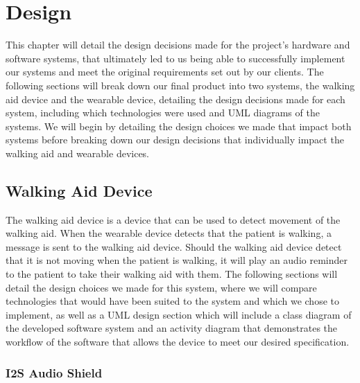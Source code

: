 \chapter{Design}
\label{ch:design}

    This chapter will detail the design decisions made for the project's hardware and software systems, that ultimately led to us being able to successfully implement our systems and meet the original requirements set out by our clients. The following sections will break down our final product into two systems, the walking aid device and the wearable device, detailing the design decisions made for each system, including which technologies were used and UML diagrams of the systems. We will begin by detailing the design choices we made that impact both systems before breaking down our design decisions that individually impact the walking aid and wearable devices.

    \section{Walking Aid Device}
    \label{sec:walking_aid}

        The walking aid device is a device that can be used to detect movement of the walking aid. When the wearable device detects that the patient is walking, a message is sent to the walking aid device. Should the walking aid device detect that it is not moving when the patient is walking, it will play an audio reminder to the patient to take their walking aid with them. The following sections will detail the design choices we made for this system, where we will compare technologies that would have been suited to the system and which we chose to implement, as well as a UML design section which will include a class diagram of the developed software system and an activity diagram that demonstrates the workflow of the software that allows the device to meet our desired specification.

        \subsection{I2S Audio Shield}
        \label{subsec:i2s_audio_shield}

